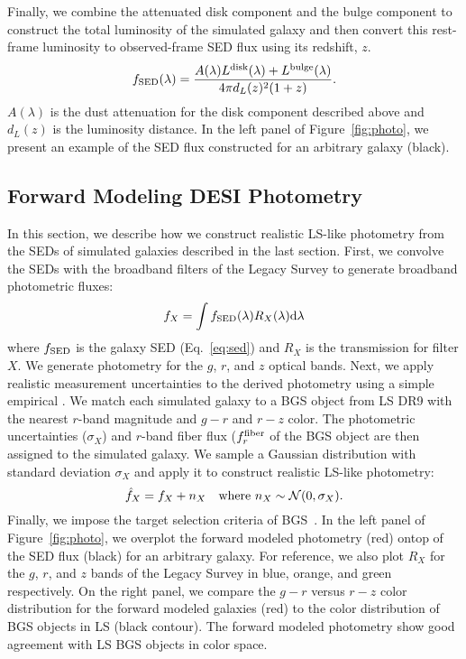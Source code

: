 Finally, we combine the attenuated disk component and the bulge component to
construct the total luminosity of the simulated galaxy and then convert this
rest-frame luminosity to observed-frame SED flux using its redshift, $z$.
\begin{equation}\label{eq:sed} 
    f_{\rm SED}(\lambda) = \frac{A(\lambda)L^{\rm disk}(\lambda) + L^{\rm bulge}(\lambda)}{4 \pi d_L(z)^2 (1+z)}.
\end{equation}
$A(\lambda)$ is the dust attenuation for the disk component described above 
and $d_L(z)$ is the luminosity distance.
In the left panel of Figure~\ref{fig:photo}, we present an example of the SED
flux constructed for an arbitrary \lgal galaxy (black).

\subsection{Forward Modeling DESI Photometry} \label{sec:photo} 
In this section, we describe how we construct realistic LS-like photometry
from the SEDs of simulated galaxies described in the last section.
First, we convolve the SEDs with the broadband filters of the Legacy Survey to
generate broadband photometric fluxes: 
\begin{equation} \label{eq:photo}
    f_X = \int f_{\rm SED}(\lambda) R_X(\lambda) {\rm d}\lambda
\end{equation}
where $f_{\rm SED}$ is the galaxy SED (Eq.~\ref{eq:sed}) and $R_X$ is the
transmission for filter $X$. 
We generate photometry for the $g$, $r$, and $z$ optical bands.
Next, we apply realistic measurement uncertainties to the derived photometry
using a simple empirical . 
We match each simulated galaxy to a BGS object from LS DR9 with the nearest $r$-band magnitude and
$g-r$ and $r-z$ color.
The photometric uncertainties ($\sigma_X$) and $r$-band fiber flux ($f_r^{\rm
fiber}$ of the BGS object are then assigned to the simulated galaxy. 
We sample a Gaussian distribution with standard deviation $\sigma_X$ and apply
it to construct realistic LS-like photometry: 
\begin{equation}
    \hat{f}_X = f_X + n_X  \quad {\rm where}~n_X \sim \mathcal{N}(0, \sigma_X).
\end{equation} 
Finally, we impose the target selection criteria of BGS~\citep[][Hahn~\etal~in
prep.]{ruiz-macias2021}.
In the left panel of Figure~\ref{fig:photo}, we overplot the forward
modeled photometry (red) ontop of the SED flux (black) for an arbitrary \lgal
galaxy. 
For reference, we also plot $R_X$ for the $g$, $r$, and $z$ bands of the Legacy
Survey in blue, orange, and green respectively. 
On the right panel, we compare the $g - r$ versus $r - z$ color distribution
for the forward modeled \lgal galaxies (red) to the color distribution of BGS
objects in LS (black contour). 
The forward modeled photometry show good agreement with LS BGS objects in
color space.

